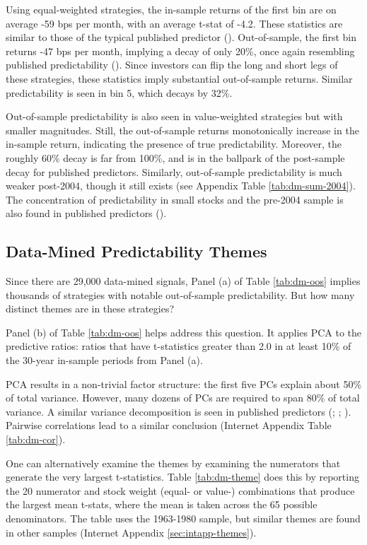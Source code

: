 Using equal-weighted strategies, the in-sample returns of the first bin are on average -59 bps per month, with an average t-stat of -4.2.  These statistics are similar to those of the typical published predictor (\citet{ChenZimmermann2021}).  Out-of-sample, the first bin returns -47 bps per month, implying a  decay of only  20\%, once again resembling published predictability (\citet{mclean2016does}).  Since investors can flip the long and short legs of these strategies, these statistics imply substantial out-of-sample returns.  Similar predictability is seen in bin 5, which decays by 32\%.  

Out-of-sample predictability is also seen in value-weighted strategies but with smaller magnitudes. Still, the out-of-sample returns monotonically increase in the in-sample return, indicating the presence of true predictability.  Moreover, the roughly  60\% decay is far from 100\%, and is in the ballpark of the post-sample decay for published predictors.  Similarly, out-of-sample predictability is much weaker post-2004, though it still exists (see Appendix Table \ref{tab:dm-sum-2004}). The concentration of predictability in small stocks and the pre-2004 sample is also found in published predictors (\citealt{chen2022zeroing}). 

\subsection{Data-Mined Predictability Themes}\label{sec:dm-themes}

Since there are 29,000 data-mined signals, Panel (a) of Table \ref{tab:dm-oos} implies thousands of strategies with notable out-of-sample predictability. But how many distinct themes are in these strategies? 

Panel (b) of Table \ref{tab:dm-oos} helps address this question. It applies PCA to the predictive ratios: ratios that have t-statistics greater than 2.0 in at least 10\% of the 30-year in-sample periods from Panel (a). 

PCA results in a non-trivial factor structure: the first five PCs explain about 50\% of total variance. However, many dozens of PCs are required to span 80\% of total variance. A similar variance decomposition is seen in published predictors (\citealt{kozak2018interpreting}; \citealt{bessembinder2021time}; \citealt{chen2023missing}). Pairwise correlations lead to a similar conclusion (Internet Appendix Table \ref{tab:dm-cor}).

One can alternatively examine the themes by examining the numerators that generate the very largest t-statistics. Table \ref{tab:dm-theme} does this by reporting the 20 numerator and stock weight (equal- or value-) combinations that produce the largest mean t-stats, where the mean is taken across the 65 possible denominators. The table uses the 1963-1980 sample, but similar themes are found in other samples (Internet Appendix \ref{sec:intapp-themes}).

